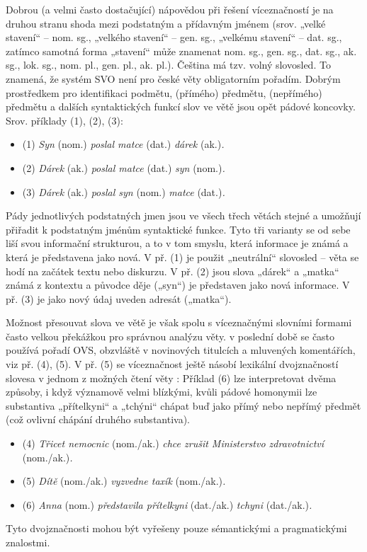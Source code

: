 \begin{multicols}{2}
Dobrou (a velmi často dostačující) nápovědou při řešení víceznačností je na druhou stranu shoda mezi podstatným a přídavným jménem (srov. „velké stavení“ – nom. sg., „velkého stavení“ – gen. sg., „velkému stavení“ – dat. sg., zatímco samotná forma „stavení“ může znamenat nom. sg., gen. sg., dat. sg., ak. sg., lok. sg., nom. pl., gen. pl., ak. pl.).
Čeština má tzv. volný slovosled. To znamená, že systém SVO není pro české věty obligatorním pořadím. Dobrým prostředkem pro identifikaci podmětu, (přímého) předmětu, (nepřímého) předmětu a dalších syntaktických funkcí slov ve větě jsou opět pádové koncovky. Srov. příklady (1), (2), (3):
\begin{itemize}
\item[] (1)	\textit{Syn} (nom.) \textit{poslal matce} (dat.) \textit{dárek} (ak.)\textit{.}
\item[] (2)	\textit{Dárek} (ak.) \textit{poslal matce} (dat.) \textit{syn} (nom.)\textit{.}
\item[] (3)	\textit{Dárek} (ak.) \textit{poslal syn} (nom.) \textit{matce} (dat.)\textit{.}
\end{itemize}
Pády jednotlivých podstatných jmen jsou ve všech třech větách stejné a umožňují přiřadit k podstatným jménům syntaktické funkce. Tyto tři varianty se od sebe liší svou informační strukturou, a to v tom smyslu, která informace je známá a která je představena jako nová. V př. (1) je použit „neutrální“ slovosled – věta se hodí na začátek textu nebo diskurzu. V př. (2) jsou slova „dárek“ a „matka“ známá z kontextu a původce děje („syn“) je představen jako nová informace. V př. (3) je jako nový údaj uveden adresát („matka“).

Možnost přesouvat slova ve větě je však spolu s víceznačnými slovními formami často velkou překážkou pro správnou analýzu věty. v poslední době se často používá pořadí OVS, obzvláště v novinových titulcích a mluvených komentářích, viz př. (4), (5). V př. (5) se víceznačnost ještě násobí lexikální dvojznačností slovesa v jednom z možných čtení věty \cite{Note4_cs}: Příklad (6) lze interpretovat dvěma způsoby, i když významově velmi blízkými, kvůli pádové homonymii lze substantiva „přítelkyni“ a „tchýni“ chápat buď jako přímý nebo nepřímý předmět (což ovlivní chápání druhého substantiva).
\begin{itemize}
\item[] (4)	\textit{Třicet nemocnic} (nom./ak.) \textit{chce zrušit Ministerstvo zdravotnictví} (nom./ak.)\textit{.}
\item[] (5)	\textit{Dítě} (nom./ak.) \textit{vyzvedne taxík} (nom./ak.)\textit{.}
\item[] (6)	\textit{Anna} (nom.) \textit{představila přítelkyni} (dat./ak.) \textit{tchyni} (dat./ak.)\textit{.}
\end{itemize}
Tyto dvojznačnosti mohou být vyřešeny pouze sémantickými a pragmatickými znalostmi.


\end{multicols}
